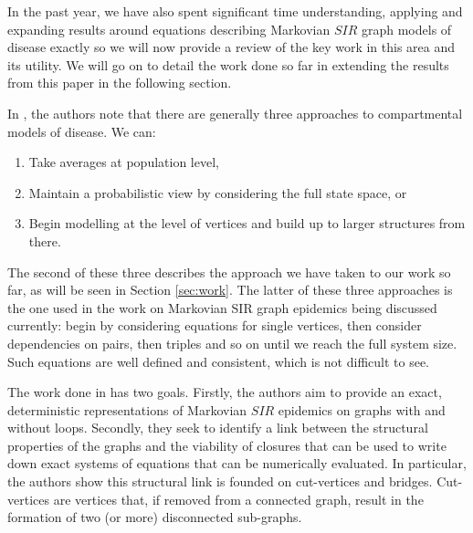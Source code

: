 \documentclass[../report.tex]{subfiles}
\begin{document}
In the past year, we have also spent significant time understanding, applying and expanding results around equations describing Markovian $SIR$ graph models of disease exactly \cite{kiss_2014} so we will now provide a review of the key work in this area and its utility. We will go on to detail the work done so far in extending the results from this paper in the following section.

In \cite{kiss_2014}, the authors note that there are generally three approaches to compartmental models of disease. We can:
\begin{enumerate}
	\item Take averages at population level, 
	\item Maintain a probabilistic view by considering the full state space, or
	\item Begin modelling at the level of vertices and build up to larger structures from there.
\end{enumerate}

The second of these three describes the approach we have taken to our work so far, as will be seen in Section \ref{sec:work}. The latter of these three approaches is the one used in the work on Markovian SIR graph epidemics being discussed currently: begin by considering equations for single vertices, then consider dependencies on pairs, then triples and so on until we reach the full system size. Such equations are well defined and consistent, which is not difficult to see.

The work done in \cite{kiss_2014} has two goals. Firstly, the authors aim to provide an exact, deterministic representations of Markovian $SIR$ epidemics on graphs with and without loops. Secondly, they seek to identify a link between the structural properties of the graphs and the viability of closures that can be used to write down exact systems of equations that can be numerically evaluated. In particular, the authors show this structural link is founded on cut-vertices and bridges. Cut-vertices are vertices that, if removed from a connected graph, result in the formation of two (or more) disconnected sub-graphs.
\end{document}
